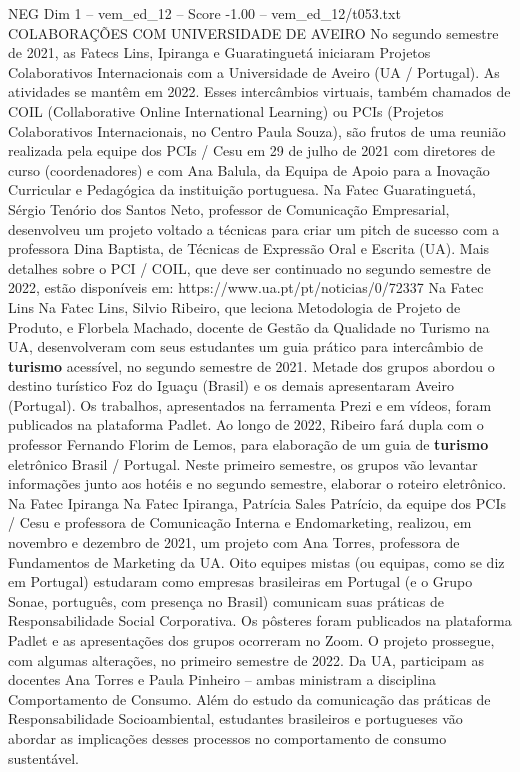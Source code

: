 \begin{textsample}{NEG Dim 1 – vem\_ed\_12 – Score -1.00 – vem\_ed\_12/t053.txt}  \label{ex:f1_neg_011}
COLABORAÇÕES COM UNIVERSIDADE DE AVEIRO No segundo semestre de 2021, as Fatecs Lins, Ipiranga e Guaratinguetá iniciaram Projetos Colaborativos Internacionais com a Universidade de Aveiro (UA / Portugal).
As atividades se mantêm em 2022.
Esses intercâmbios virtuais, também chamados de COIL (Collaborative Online International Learning) ou PCIs (Projetos Colaborativos Internacionais, no Centro Paula Souza), são frutos de uma reunião realizada pela equipe dos PCIs / Cesu em 29 de julho de 2021 com diretores de curso (coordenadores) e com Ana Balula, da Equipa de Apoio para a Inovação Curricular e Pedagógica da instituição portuguesa.
Na Fatec Guaratinguetá, Sérgio Tenório dos Santos Neto, professor de Comunicação Empresarial, desenvolveu um projeto voltado a técnicas para criar um pitch de sucesso com a professora Dina Baptista, de Técnicas de Expressão Oral e Escrita (UA).
Mais detalhes sobre o PCI / COIL, que deve ser continuado no segundo semestre de 2022, estão disponíveis em: https://www.ua.pt/pt/noticias/0/72337 Na Fatec Lins Na Fatec Lins, Silvio Ribeiro, que leciona Metodologia de Projeto de Produto, e Florbela Machado, docente de Gestão da Qualidade no Turismo na UA, desenvolveram com seus estudantes um guia prático para intercâmbio de \textbf{turismo} acessível, no segundo semestre de 2021.
Metade dos grupos abordou o destino turístico Foz do Iguaçu (Brasil) e os demais apresentaram Aveiro (Portugal).
Os trabalhos, apresentados na ferramenta Prezi e em vídeos, foram publicados na plataforma Padlet.
Ao longo de 2022, Ribeiro fará dupla com o professor Fernando Florim de Lemos, para elaboração de um guia de \textbf{turismo} eletrônico Brasil / Portugal.
Neste primeiro semestre, os grupos vão levantar informações junto aos hotéis e no segundo semestre, elaborar o roteiro eletrônico.
Na Fatec Ipiranga Na Fatec Ipiranga, Patrícia Sales Patrício, da equipe dos PCIs / Cesu e professora de Comunicação Interna e Endomarketing, realizou, em novembro e dezembro de 2021, um projeto com Ana Torres, professora de Fundamentos de Marketing da UA.
Oito equipes mistas (ou equipas, como se diz em Portugal) estudaram como empresas brasileiras em Portugal (e o Grupo Sonae, português, com presença no Brasil) comunicam suas práticas de Responsabilidade Social Corporativa.
Os pôsteres foram publicados na plataforma Padlet e as apresentações dos grupos ocorreram no Zoom.
O projeto prossegue, com algumas alterações, no primeiro semestre de 2022.
Da UA, participam as docentes Ana Torres e Paula Pinheiro – ambas ministram a disciplina Comportamento de Consumo.
Além do estudo da comunicação das práticas de Responsabilidade Socioambiental, estudantes brasileiros e portugueses vão abordar as implicações desses processos no comportamento de consumo sustentável.

\end{textsample}
